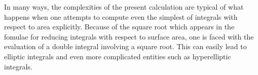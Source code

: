 \documentclass[12pt]{article}
\begin{document}
In many ways, the complexities of the present calculation are typical of what happens when one attempts to compute even the simplest of integrals with respect to area explicitly.  Because of the square root which appears in the fomulae for reducing integrals with respect to surface area, one is faced with the evaluation of a double integral involving a square root.  This can easily lead to elliptic integrals and even more complicated entities such as hyperelliptic integrals.


\end{document}
